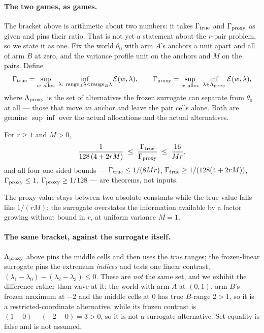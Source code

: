 
\paragraph{The two games, as games.}
The bracket above is arithmetic about two numbers: it takes $\Gamma_{\rm true}$ and
$\Gamma_{\rm proxy}$ as given and pins their ratio. That is not yet a statement about the
$r$-pair problem, so we state it as one. Fix the world
$\theta_{0}$ with arm $A$'s anchors a unit apart and all of arm $B$ at zero, and the
variance profile unit on the anchors and $M$ on the pairs. Define
\[
\Gamma_{\rm true}
=\sup_{w\ \rm alloc}\ \inf_{\lambda:\ \mathrm{range}_{A}\lambda<\mathrm{range}_{B}\lambda}
  \mathcal{E}(w,\lambda),
\qquad
\Gamma_{\rm proxy}
=\sup_{w\ \rm alloc}\ \inf_{\lambda\in\Lambda_{\rm proxy}}\mathcal{E}(w,\lambda),
\]
where $\Lambda_{\rm proxy}$ is the set of alternatives the frozen surrogate can separate
from $\theta_{0}$ at all --- those that move an anchor and leave the pair cells alone.
Both are genuine $\sup\inf$ over the actual allocations and the actual alternatives.

\begin{theorem}
\label{thm:rpairgames}
For $r\ge1$ and $M>0$,
\[
\frac{1}{128\,(4+2rM)}
\;\le\;\frac{\Gamma_{\rm true}}{\Gamma_{\rm proxy}}\;\le\;
\frac{16}{Mr},
\]
and all four one-sided bounds --- $\Gamma_{\rm true}\le1/(8Mr)$,
$\Gamma_{\rm true}\ge1/(128(4+2rM))$, $\Gamma_{\rm proxy}\le1$,
$\Gamma_{\rm proxy}\ge1/128$ --- are theorems, not inputs.
\end{theorem}

The proxy value stays between two absolute constants while the true value falls like
$1/(rM)$: the surrogate overstates the information available by a factor growing without
bound in $r$, at uniform variance $M=1$.

\paragraph{The same bracket, against the surrogate itself.}
$\Lambda_{\rm proxy}$ above pins the middle cells and then uses the \emph{true} ranges;
the frozen-linear surrogate pins the extremum \emph{indices} and tests one linear
contrast, $(\lambda_{1}-\lambda_{0})-(\lambda_{2}-\lambda_{3})\le0$. These are
\emph{not} the same set, and we exhibit the difference rather than wave at it: the world
with arm $A$ at $(0,1)$, arm $B$'s frozen maximum at $-2$ and the middle cells at $0$ has
true $B$-range $2>1$, so it is a restricted-coordinate alternative, while its frozen
contrast is $(1-0)-(-2-0)=3>0$, so it is not a surrogate alternative. Set equality is
false and is not assumed.

